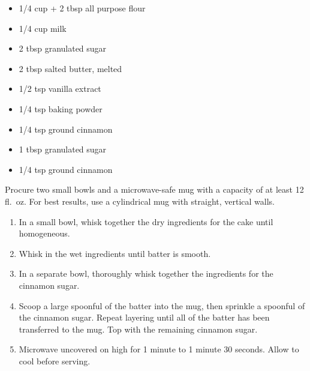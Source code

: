 \begin{minipage}{\textwidth}
\begin{multicols*}{2}
\begin{minipage}{\linewidth}
\ingredients[Cake]
\vspace{-1em}
\begin{itemize}
    \item 1/4 cup + 2 tbsp all purpose flour
    \item 1/4 cup milk
    \item 2 tbsp granulated sugar
    \item 2 tbsp salted butter, melted
    \item 1/2 tsp vanilla extract
    \item 1/4 tsp baking powder
    \item 1/4 tsp ground cinnamon
\end{itemize}
\end{minipage}

\columnbreak
\begin{minipage}{\linewidth}
\vspace{-1em}
\begin{itemize}
    \item 1 tbsp granulated sugar
    \item 1/4 tsp ground cinnamon
\end{itemize}
\end{minipage}
\end{multicols*}

\instructions
Procure two small bowls and a microwave-safe mug with a capacity of at least 12 fl.\ oz. For best results, use a cylindrical mug with straight, vertical walls.
\begin{enumerate}
    \item In a small bowl, whisk together the dry ingredients for the cake until homogeneous.
    \item Whisk in the wet ingredients until batter is smooth.
    \item In a separate bowl, thoroughly whisk together the ingredients for the cinnamon sugar.
    \item Scoop a large spoonful of the batter into the mug, then sprinkle a spoonful of the cinnamon sugar. Repeat layering until all of the batter has been transferred to the mug. Top with the remaining cinnamon sugar.
    \item Microwave uncovered on high for 1 minute to 1 minute 30 seconds. Allow to cool before serving.
\end{enumerate}
\end{minipage}

\spewfootnotes


